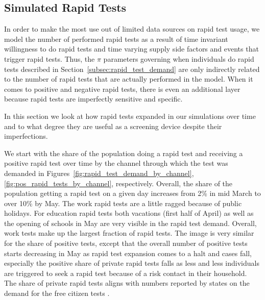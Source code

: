 \subsection{Simulated Rapid Tests}
\label{subsec:results_rapid_test_statistics}

In order to make the most use out of limited data sources on rapid test usage, we model the
number of performed rapid tests as a result of time invariant willingness to do rapid
tests and time varying supply side factors and events that trigger rapid tests. Thus, the
$\pi$ parameters governing when individuals do rapid tests described in
Section~\ref{subsec:rapid_test_demand} are only indirectly related to the number of rapid
tests that are actually performed in the model. When it comes to positive and negative
rapid tests, there is even an additional layer because rapid tests are imperfectly
sensitive and specific.

In this section we look at how rapid tests expanded in our simulations over time and to
what degree they are useful as a screening device despite their imperfections.

We start with the share of the population doing a rapid test and receiving a positive rapid test
over time by the channel through which the test was demanded in
Figures~\ref{fig:rapid_test_demand_by_channel}, \ref{fig:pos_rapid_tests_by_channel}, respectively.
Overall, the share of the population getting a rapid test on a given day increases from 2\% in mid
March to over 10\% by May. The work rapid tests are a little ragged because of public holidays. For
education rapid tests both vacations (first half of April) as well as the opening of schools in May
are very visible in the rapid test demand. Overall, work tests make up the largest fraction of rapid
tests. The image is very similar for the share of positive tests, except that the overall number of
positive tests starts decreasing in May as rapid test expansion comes to a halt and cases fall,
especially the positive share of private rapid tests falls as less and less individuals are
triggered to seek a rapid test because of a risk contact in their household. The share of private
rapid tests aligns with numbers reported by states on the demand for the free citizen tests
\citep{NRW_rapid_tests}.

